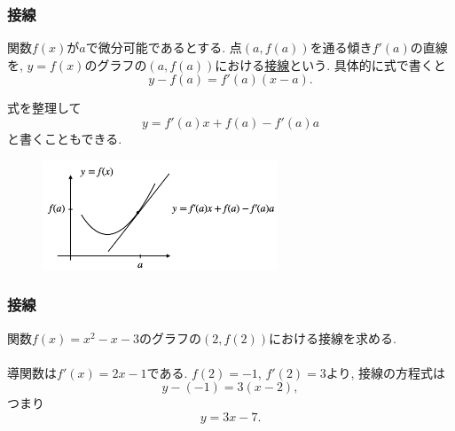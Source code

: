 




\begin{frame}
\frametitle{接線}

\vspace{-2mm}

\begin{Def}
関数$f(x)$が$a$で微分可能であるとする. 
点$(a,f(a))$を通る傾き$f'(a)$の直線を, $y=f(x)$のグラフの$(a,f(a))$における\underline{接線}という. 
具体的に式で書くと
$$
y-f(a)=f'(a)(x-a). 
$$
\end{Def}
式を整理して
$$
y=f'(a)x + f(a) -f'(a)a
$$
と書くこともできる. 
\vspace{-2mm}

 \begin{figure}[htbp]
 \begin{center} 
  \includegraphics[width=70mm]{calculus7/tangent.png}
 \end{center}
\end{figure}


\end{frame}








\begin{frame}
\frametitle{接線}


関数$f(x)=x^2-x-3$のグラフの$(2,f(2))$における接線を求める. \\
\ \\

導関数は$f'(x)=2x-1$である. 
$f(2)=-1$, $f'(2)=3$より, 接線の方程式は
$$
y-(-1)=3(x-2), 
$$
つまり
$$
y=3x-7. 
$$




\end{frame}

